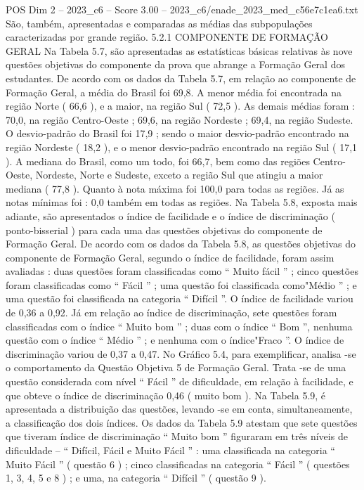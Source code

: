 \begin{textsample}{POS Dim 2 – 2023\_c6 – Score 3.00 – 2023\_c6/enade\_2023\_med\_c56e7c1ea6.txt}
São, também, apresentadas e comparadas as médias das subpopulações caracterizadas por grande região. 5.2.1 COMPONENTE DE FORMAÇÃO GERAL Na Tabela 5.7, são apresentadas as estatísticas básicas relativas às nove questões objetivas do componente da prova que abrange a Formação Geral dos estudantes.
De acordo com os dados da Tabela 5.7, em relação ao componente de Formação Geral, a média do Brasil foi 69,8.
A menor média foi encontrada na região Norte ( 66,6 ), e a maior, na região Sul ( 72,5 ).
As demais médias foram : 70,0, na região Centro-Oeste ; 69,6, na região Nordeste ; 69,4, na região Sudeste.
O desvio-padrão do Brasil foi 17,9 ; sendo o maior desvio-padrão encontrado na região Nordeste ( 18,2 ), e o menor desvio-padrão encontrado na região Sul ( 17,1 ).
A mediana do Brasil, como um todo, foi 66,7, bem como das regiões Centro-Oeste, Nordeste, Norte e Sudeste, exceto a região Sul que atingiu a maior mediana ( 77,8 ).
Quanto à nota máxima foi 100,0 para todas as regiões.
Já as notas mínimas foi : 0,0 também em todas as regiões.
Na Tabela 5.8, exposta mais adiante, são apresentados o índice de facilidade e o índice de discriminação ( ponto-bisserial ) para cada uma das questões objetivas do componente de Formação Geral.
De acordo com os dados da Tabela 5.8, as questões objetivas do componente de Formação Geral, segundo o índice de facilidade, foram assim avaliadas : duas questões foram classificadas como “ Muito fácil ” ; cinco questões foram classificadas como “ Fácil ” ; uma questão foi classificada como"Médio ” ; e uma questão foi classificada na categoria “ Difícil ”.
O índice de facilidade variou de 0,36 a 0,92.
Já em relação ao índice de discriminação, sete questões foram classificadas com o índice “ Muito bom ” ; duas com o índice “ Bom ”, nenhuma questão com o índice “ Médio ” ; e nenhuma com o índice"Fraco ”.
O índice de discriminação variou de 0,37 a 0,47.
No Gráfico 5.4, para exemplificar, analisa -se o comportamento da Questão Objetiva 5 de Formação Geral.
Trata -se de uma questão considerada com nível “ Fácil ” de dificuldade, em relação à facilidade, e que obteve o índice de discriminação 0,46 ( muito bom ).
Na Tabela 5.9, é apresentada a distribuição das questões, levando -se em conta, simultaneamente, a classificação dos dois índices.
Os dados da Tabela 5.9 atestam que sete questões que tiveram índice de discriminação “ Muito bom ” figuraram em três níveis de dificuldade – “ Difícil, Fácil e Muito Fácil ” : uma classificada na categoria “ Muito Fácil ” ( questão 6 ) ; cinco classificadas na categoria “ Fácil ” ( questões 1, 3, 4, 5 e 8 ) ; e uma, na categoria “ Difícil ” ( questão 9 ).

\end{textsample}
